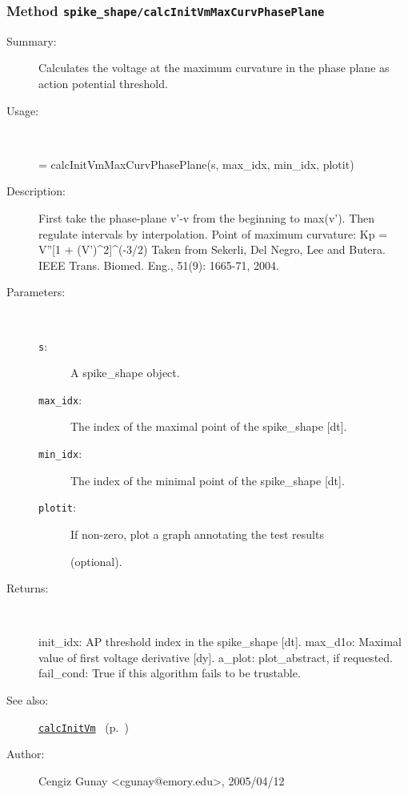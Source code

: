 \subsubsection[Method \texttt{calcInitVmMaxCurvPhasePlane}]{Method \texttt{spike\_shape/calcInitVmMaxCurvPhasePlane}}%
%
\label{ref_spike_shape__calcInitVmMaxCurvPhasePlane}%
\hypertarget{ref_spike_shape__calcInitVmMaxCurvPhasePlane}{}%
\begin{description}
\item[Summary:]Calculates the voltage at the maximum curvature in the phase plane as action potential threshold.
%
\item[Usage:]~%
\begin{lyxcode}%
[init\_idx, max\_d1o, a\_plot, fail\_cond] = 
	calcInitVmMaxCurvPhasePlane(s, max\_idx, min\_idx, plotit)
%
\end{lyxcode}%
%
\item[Description:]%
First take the phase-plane v'-v from the beginning to max(v'). Then regulate 
 intervals by interpolation. Point of maximum curvature: Kp = V''[1 + (V')\textasciicircum{}2]\textasciicircum{}(-3/2)
 Taken from Sekerli, Del Negro, Lee and Butera. 
 IEEE Trans. Biomed. Eng., 51(9): 1665-71, 2004.
\item[Parameters:]~
\begin{description}%
\item[\texttt{s}:]
 A spike\_shape object.
\item[\texttt{max\_idx}:]
 The index of the maximal point of the spike\_shape [dt].
\item[\texttt{min\_idx}:]
 The index of the minimal point of the spike\_shape [dt].
\item[\texttt{plotit}:]
 If non-zero, plot a graph annotating the test results 

(optional).\end{description}%
%
\item[Returns:]~

	init\_idx: AP threshold index in the spike\_shape [dt].
	max\_d1o: Maximal value of first voltage derivative [dy].
	a\_plot: plot\_abstract, if requested.
	fail\_cond: True if this algorithm fails to be trustable.
%
%
\item[See also:]%
\hyperlink{ref_calcInitVm}{\texttt{calcInitVm}}%
\ (p.~\pageref{ref_calcInitVm})%
%
%
\item[Author:]%
Cengiz Gunay <cgunay@emory.edu>, 2005/04/12%
\end{description}
\methodline%
